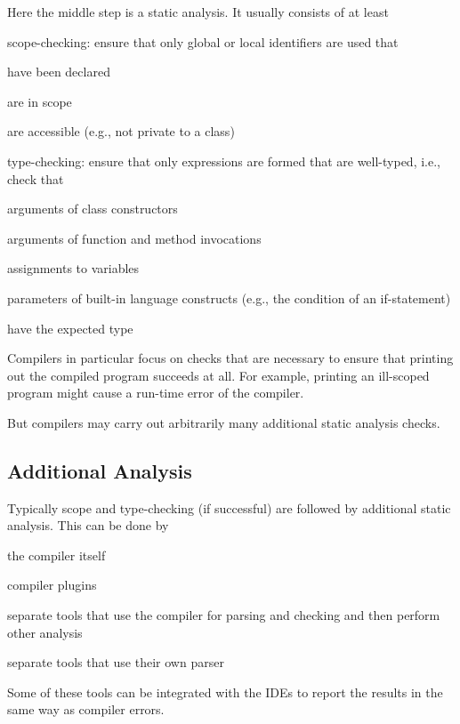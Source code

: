 Here the middle step is a static analysis.
It usually consists of at least
\begin{compactitem}
 \item scope-checking: ensure that only global or local identifiers are used that
  \begin{compactitem}
   \item have been declared
   \item are in scope
   \item are accessible (e.g., not private to a class)
  \end{compactitem}
 \item type-checking: ensure that only expressions are formed that are well-typed, i.e., check that
 \begin{compactitem}
  \item arguments of class constructors
  \item arguments of function and method invocations
  \item assignments to variables
  \item parameters of built-in language constructs (e.g., the condition of an if-statement)
  \end{compactitem}
  have the expected type
\end{compactitem}

Compilers in particular focus on checks that are necessary to ensure that printing out the compiled program succeeds at all.
For example, printing an ill-scoped program might cause a run-time error of the compiler. 

But compilers may carry out arbitrarily many additional static analysis checks.

\subsection{Additional Analysis}

Typically scope and type-checking (if successful) are followed by additional static analysis.
This can be done by
\begin{compactitem}
 \item the compiler itself
 \item compiler plugins
 \item separate tools that use the compiler for parsing and checking and then perform other analysis
 \item separate tools that use their own parser
\end{compactitem}
Some of these tools can be integrated with the IDEs to report the results in the same way as compiler errors.

